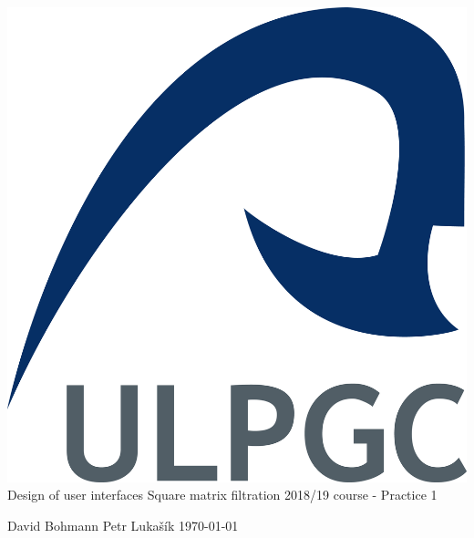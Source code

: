 \documentclass[12pt]{report}
\begin{document}
%
%
\begin{center}
\includegraphics[scale=0.2]{img/ulpgc_logo.jpg}
\vspace{5cm}\linebreak
\Huge{Design of user interfaces}\linebreak
\large{Square matrix filtration}\linebreak
\normalsize{2018/19 course - Practice 1}\linebreak
\vspace{3cm}\linebreak

\small{David Bohmann}\linebreak
\small{Petr Lukašík}\linebreak
\today\linebreak
\end{center}
%
%

%
%
\newpage
{\footnotesize \tableofcontents}

%
%
\end{document}
